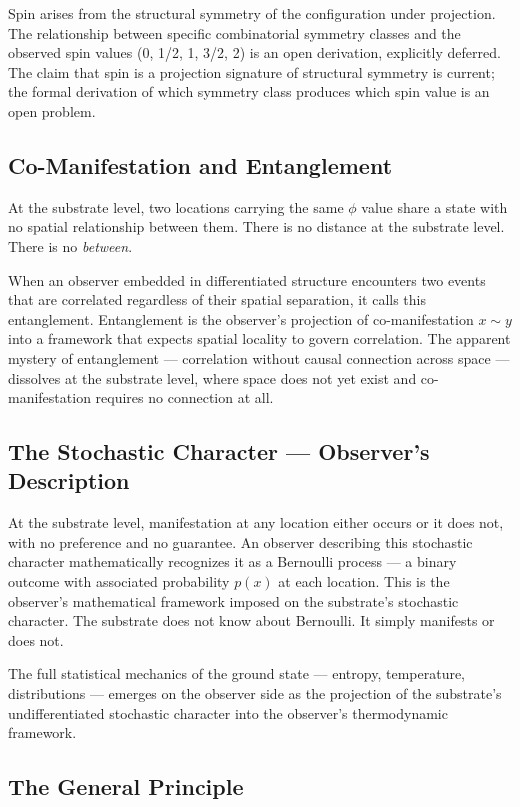 \documentclass[11pt,letterpaper]{article}
\begin{document}
Spin arises from the structural symmetry of the configuration under projection. The relationship between specific combinatorial symmetry classes and the observed spin values (0, 1/2, 1, 3/2, 2) is an open derivation, explicitly deferred. The claim that spin is a projection signature of structural symmetry is current; the formal derivation of which symmetry class produces which spin value is an open problem.
\subsection{Co-Manifestation and Entanglement}
\label{sec:orgd9e13bc}

At the substrate level, two locations carrying the same \(\phi\) value share a state with no spatial relationship between them. There is no distance at the substrate level. There is no \emph{between}.

When an observer embedded in differentiated structure encounters two events that are correlated regardless of their spatial separation, it calls this entanglement. Entanglement is the observer's projection of co-manifestation \(x \sim y\) into a framework that expects spatial locality to govern correlation. The apparent mystery of entanglement --- correlation without causal connection across space --- dissolves at the substrate level, where space does not yet exist and co-manifestation requires no connection at all.
\subsection{The Stochastic Character --- Observer's Description}
\label{sec:orgfd34209}

At the substrate level, manifestation at any location either occurs or it does not, with no preference and no guarantee. An observer describing this stochastic character mathematically recognizes it as a Bernoulli process --- a binary outcome with associated probability \(p(x)\) at each location. This is the observer's mathematical framework imposed on the substrate's stochastic character. The substrate does not know about Bernoulli. It simply manifests or does not.

The full statistical mechanics of the ground state --- entropy, temperature, distributions --- emerges on the observer side as the projection of the substrate's undifferentiated stochastic character into the observer's thermodynamic framework.
\subsection{The General Principle}
\label{sec:orgca3f71c}
\end{document}
